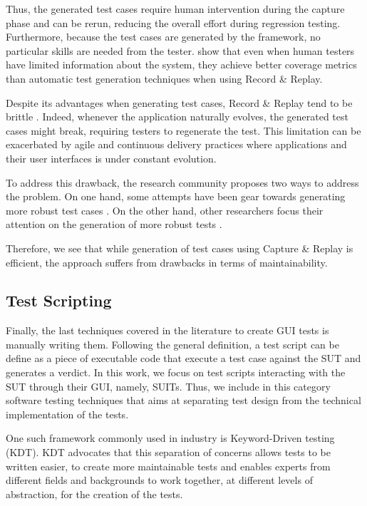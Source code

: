 Thus, the generated test cases require human intervention during the capture phase and can be rerun, reducing the overall effort during regression testing. Furthermore, because the test cases are generated by the framework, no particular skills are needed from the tester. \textcite{DiMartino2021} show that even when human testers have limited information about the system, they achieve better coverage metrics than automatic test generation techniques when using Record \& Replay.

Despite its advantages when generating test cases, Record \& Replay tend to be brittle \cite{Hammoudi2016}. Indeed, whenever the application naturally evolves, the generated test cases might break, requiring testers to regenerate the test. This limitation can be exacerbated by agile and continuous delivery practices where applications and their user interfaces is under constant evolution.

To address this drawback, the research community proposes two ways to address the problem. On one hand, some attempts have been gear towards generating more robust test cases \cite{Hammoudi2016b}. On the other hand, other researchers focus their attention on the generation of more robust tests \cite{Ronsse1999}.

Therefore, we see that while generation of test cases using Capture \& Replay is efficient, the approach suffers from drawbacks in terms of maintainability.

\subsection{Test Scripting}
\label{sec:introduction-test-scripting}

Finally, the last techniques covered in the literature to create GUI tests is manually writing them. Following the general definition, a test script can be define as a piece of executable code that execute a test case against the SUT and generates a verdict. In this work, we focus on test scripts interacting with the SUT through their GUI, namely, SUITs. Thus, we include in this category software testing techniques that aims at separating test design from the technical implementation of the tests.

One such framework commonly used in industry is Keyword-Driven testing (KDT). KDT advocates that this separation of concerns allows tests to be written easier, to create more maintainable tests and enables experts from different fields and backgrounds to work together, at different levels of abstraction, for the creation of the tests.

